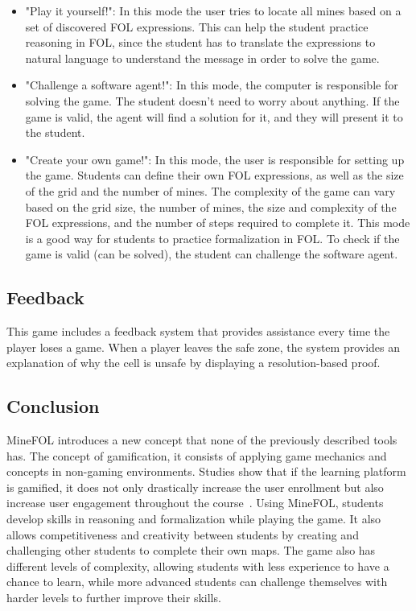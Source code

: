 \begin{itemize}
    \item "Play it yourself!": In this mode the user tries to locate all mines based on a set of discovered \gls{FOL} expressions. This can help the student practice reasoning in \gls{FOL}, since the student has to translate the expressions to natural language to understand the message in order to solve the game.
    \item "Challenge a software agent!": In this mode, the computer is responsible for solving the game. The student doesn't need to worry about anything. If the game is valid, the agent will find a solution for it, and they will present it to the student.
    \item "Create your own game!": In this mode, the user is responsible for setting up the game. Students can define their own \gls{FOL} expressions, as well as the size of the grid and the number of mines. The complexity of the game can vary based on the grid size, the number of mines, the size and complexity of the \gls{FOL} expressions, and the number of steps required to complete it. This mode is a good way for students to practice formalization in \gls{FOL}. To check if the game is valid (can be solved), the student can challenge the software agent.
\end{itemize}

\subsection{Feedback}
This game includes a feedback system that provides assistance every time the player loses a game. When a player leaves the safe zone, the system provides an explanation of why the cell is unsafe by displaying a resolution-based proof.

\subsection{Conclusion}
MineFOL introduces a new concept that none of the previously described tools has. The concept of gamification, it consists of applying game mechanics and concepts in non-gaming environments. Studies show that if the learning platform is gamified, it does not only drastically increase the user enrollment but also increase user engagement throughout the course~\cite{vaibhav_gamification}. Using MineFOL, students develop skills in reasoning and formalization while playing the game. It also allows competitiveness and creativity between students by creating and challenging other students to complete their own maps. The game also has different levels of complexity, allowing students with less experience to have a chance to learn, while more advanced students can challenge themselves with harder levels to further improve their skills.